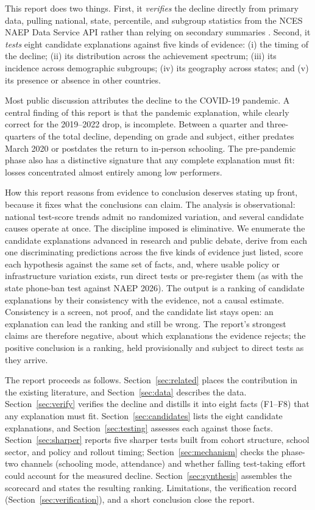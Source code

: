 \documentclass[11pt]{article}
\begin{document}
This report does two things. First, it \emph{verifies} the decline directly from primary data, pulling national, state, percentile, and subgroup statistics from the NCES NAEP Data Service API rather than relying on secondary summaries \citep{naepapi}. Second, it \emph{tests} eight candidate explanations against five kinds of evidence: (i) the timing of the decline; (ii) its distribution across the achievement spectrum; (iii) its incidence across demographic subgroups; (iv) its geography across states; and (v) its presence or absence in other countries.

Most public discussion attributes the decline to the COVID-19 pandemic. A central finding of this report is that the pandemic explanation, while clearly correct for the 2019--2022 drop, is incomplete. Between a quarter and three-quarters of the total decline, depending on grade and subject, either predates March 2020 or postdates the return to in-person schooling. The pre-pandemic phase also has a distinctive signature that any complete explanation must fit: losses concentrated almost entirely among low performers.

How this report reasons from evidence to conclusion deserves stating up front, because it fixes what the conclusions can claim. The analysis is observational: national test-score trends admit no randomized variation, and several candidate causes operate at once. The discipline imposed is eliminative. We enumerate the candidate explanations advanced in research and public debate, derive from each one discriminating predictions across the five kinds of evidence just listed, score each hypothesis against the same set of facts, and, where usable policy or infrastructure variation exists, run direct tests or pre-register them (as with the state phone-ban test against NAEP 2026). The output is a ranking of candidate explanations by their consistency with the evidence, not a causal estimate. Consistency is a screen, not proof, and the candidate list stays open: an explanation can lead the ranking and still be wrong. The report's strongest claims are therefore negative, about which explanations the evidence rejects; the positive conclusion is a ranking, held provisionally and subject to direct tests as they arrive.

The report proceeds as follows. Section~\ref{sec:related} places the contribution in the existing literature, and Section~\ref{sec:data} describes the data. Section~\ref{sec:verify} verifies the decline and distills it into eight facts (F1--F8) that any explanation must fit. Section~\ref{sec:candidates} lists the eight candidate explanations, and Section~\ref{sec:testing} assesses each against those facts. Section~\ref{sec:sharper} reports five sharper tests built from cohort structure, school sector, and policy and rollout timing; Section~\ref{sec:mechanism} checks the phase-two channels (schooling mode, attendance) and whether falling test-taking effort could account for the measured decline. Section~\ref{sec:synthesis} assembles the scorecard and states the resulting ranking. Limitations, the verification record (Section~\ref{sec:verification}), and a short conclusion close the report.
\end{document}
